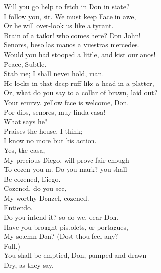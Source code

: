 \documentclass[a4paper,oneside,12pt]{memoir}
\begin{document}
\begin{drama*}
\facespeaks Will you go help to fetch in Don in state?\\
\subtlespeaks I follow you, sir. We must keep Face in awe,\\
Or he will over-look us like a tyrant.\\
Brain of a tailor! who comes here? Don John!\\
\surlyspeaks Senores, beso las manos a vuestras mercedes.\\
\subtlespeaks Would you had stooped a little, and kist our anos!\\
\facespeaks Peace, Subtle.\\
\subtlespeaks {} Stab me; I shall never hold, man.\\
He looks in that deep ruff like a head in a platter,\\
\facespeaks Or, what do you say to a collar of brawn, laid out?\\
Your scurvy, yellow  face is welcome, Don.\\
\surlyspeaks Por dios, senores, muy linda casa!\\
\subtlespeaks What says he?\\
\facespeaks {} Praises the house, I think;\\
I know no more but his action.\\
\subtlespeaks {} Yes, the casa,\\
My precious Diego, will prove fair enough\\
To cozen you in. Do you mark? you shall\\
Be cozened, Diego.\\
\facespeaks {} Cozened, do you see,\\
My worthy Donzel, cozened.\\
\surlyspeaks {} Entiendo.\\
\subtlespeaks Do you intend it? so do we, dear Don.\\
Have you brought pistolets, or portagues,\\
My solemn Don? (Dost thou feel any?\\
\facespeaks {} Full.)\\
\subtlespeaks You shall be emptied, Don, pumped and drawn\\
Dry, as they say.\\

\end{drama*}
\end{document}
